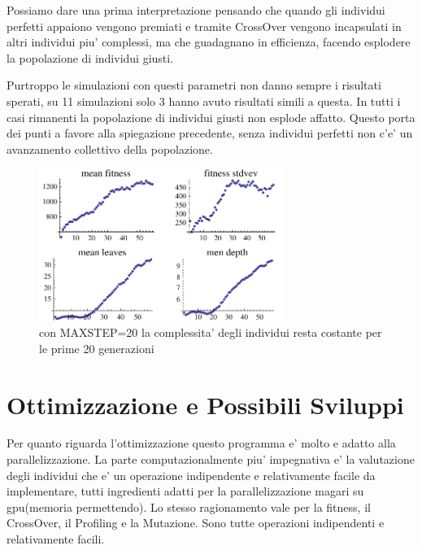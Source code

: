 \documentclass[12pt, a4paper]{article}
\begin{document}
Possiamo dare una prima interpretazione pensando che quando gli individui perfetti appaiono vengono premiati e tramite CrossOver vengono incapsulati in altri individui piu' complessi, ma che guadagnano in efficienza, facendo esplodere la popolazione di individui giusti.

Purtroppo le simulazioni con questi parametri non danno sempre i risultati sperati, su 11 simulazioni solo 3 hanno avuto risultati simili a questa. In tutti i casi rimanenti la popolazione di individui giusti non esplode affatto. Questo porta dei punti a favore alla spiegazione precedente, senza individui perfetti non c'e' un avanzamento collettivo della popolazione.

\begin{figure}
\begin{center}
\includegraphics[width=8.0cm]{expr9_run1.pdf}
\caption{con MAXSTEP=20 la complessita' degli individui resta costante per le prime 20 generazioni} 
\label{figure:expr9run1}
\end{center}
\end{figure}



\section{Ottimizzazione e Possibili Sviluppi}
\label{sec:opti}
Per quanto riguarda l'ottimizzazione questo programma e' molto e adatto alla parallelizzazione. La parte computazionalmente piu' impegnativa e' la valutazione degli individui che e' un operazione indipendente e relativamente facile da implementare, tutti ingredienti adatti per la parallelizzazione magari su gpu(memoria permettendo). Lo stesso ragionamento vale per la fitness, il CrossOver, il Profiling e la Mutazione. Sono tutte operazioni indipendenti e relativamente facili.
\end{document}
